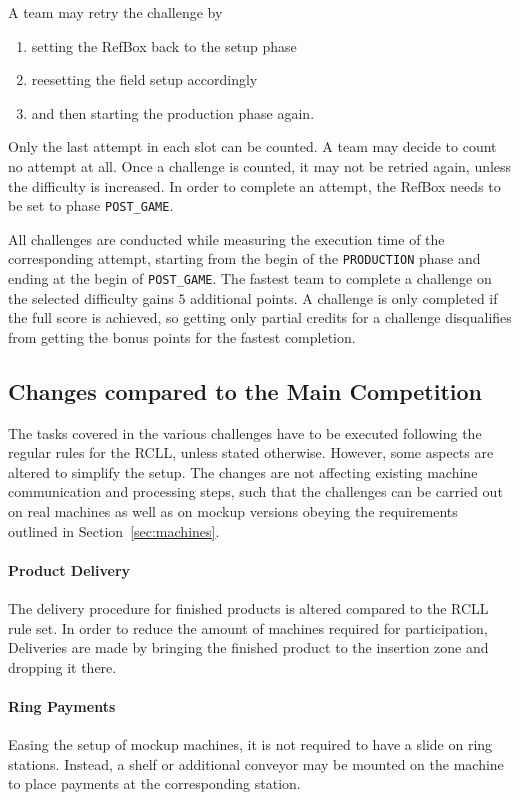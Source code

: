 \documentclass[12pt,twoside]{article}
\newcommand{\refsec}[1]{Section~\ref{#1}}
\begin{document}
A team may retry the challenge by
\begin{enumerate}
	\item setting the RefBox back to the setup phase
	\item reesetting the field setup accordingly
	\item and then starting the production phase again.
\end{enumerate}
Only the last attempt in each slot can be counted. A team may decide to count
no attempt at all. Once a challenge is counted, it
may not be retried again, unless the difficulty is increased.
In order to complete an attempt, the RefBox needs to be set to phase
\texttt{POST\_GAME}.

All challenges are conducted while measuring the execution time of the
corresponding attempt, starting from the begin of the \texttt{PRODUCTION} phase
and ending at the begin of \texttt{POST\_GAME}.
The fastest team to complete a challenge on the selected difficulty gains $5$
additional points. A challenge is only completed if the full score is achieved,
so getting only partial credits for a challenge disqualifies from getting the
bonus points for the fastest completion.

\subsection{Changes compared to the Main Competition}
The tasks covered in the various challenges have to be executed following the
regular rules for the \ac{RCLL}, unless stated otherwise.
However, some aspects are altered to simplify the setup.
The changes are not affecting existing machine communication and processing
steps, such that the challenges can be carried out on real machines as well as
on mockup versions obeying the requirements outlined in \refsec{sec:machines}.

\paragraph{Product Delivery}
The delivery procedure for finished products is altered compared to the
\ac{RCLL} rule set. In order to reduce the amount of machines required
for participation, Deliveries are made by bringing the finished product
to the insertion zone and dropping it there.

\paragraph{Ring Payments}
Easing the setup of mockup machines, it is not required to have a slide
on ring stations. Instead, a shelf or additional conveyor may be mounted on the
machine to place payments at the corresponding station.
\end{document}
